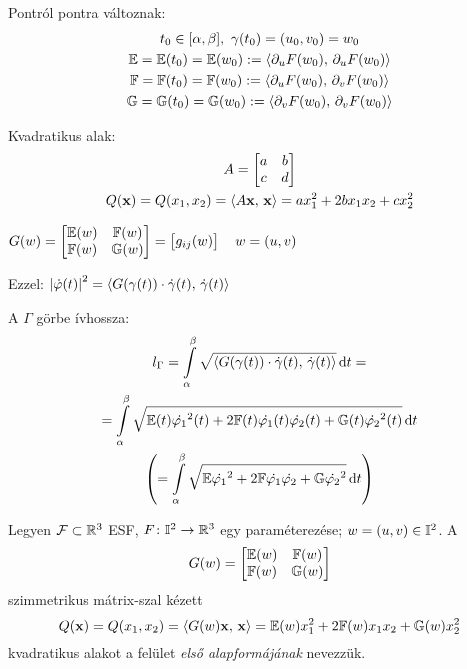 \begin{de}%
  Pontról pontra változnak:
  \begin{gather*}
    t_0\in[\alpha,\beta],\ \gamma(t_0)=(u_0,v_0)=w_0\\
    \mathbb E = \mathbb E(t_0) = \mathbb E(w_0) :=\langle\partial_uF(w_0),\,\partial_uF(w_0)\rangle\\
    \mathbb F = \mathbb F(t_0) = \mathbb F(w_0) :=\langle\partial_uF(w_0),\,\partial_vF(w_0)\rangle\\
    \mathbb G = \mathbb G(t_0) = \mathbb G(w_0) :=\langle\partial_vF(w_0),\,\partial_vF(w_0)\rangle
  \end{gather*}  
\end{de}
\begin{Megj}
\item Kvadratikus alak: 
  \begin{gather*}
    A = \begin{bmatrix} a & b \\ c & d \end{bmatrix}\\
    Q(\mathbf{x}) = Q(x_1,x_2) = \langle A\mathbf{x},\,\mathbf{x}\rangle = ax_1^2 + 2bx_1x_2 + cx_2^2
  \end{gather*}
\item  $G(w) = \begin{bmatrix} \mathbb E(w) &\mathbb F(w)\\ \mathbb F(w) &\mathbb G(w) \end{bmatrix} = \begin{bmatrix} g_{ij}(w) \end{bmatrix}
  \quad w = (u,v)$  
  
  \noindent Ezzel: $\left\vert \Dot{\varphi}(t) \right\vert^2 = \langle G(\gamma(t))\cdot\Dot\gamma(t),\,\Dot\gamma(t)\rangle$
  
  \noindent A $\Gamma$ görbe ívhossza:
  \begin{gather*}
    l_\Gamma = \Int_\alpha^\beta \sqrt{ \skalar{G(\gamma(t))\cdot\Dot\gamma(t)}{\Dot\gamma(t)}}\diff t = \\
    = \Int_\alpha^\beta \sqrt{ \eE(t)\Dot{\vfi_1}^2(t) + 2\eF(t)\Dot{\vfi_1}(t)\Dot{\vfi_2}(t) +
      \eG(t)\Dot{\vfi_2}^2(t)} \diff t\\ \left(= \Int_\alpha^\beta \sqrt{\eE\Dot{\vfi_1}^2 + 2\eF\Dot{\vfi_1}\Dot{\vfi_2}
      + \eG\Dot{\vfi_2}^2}\diff t\right)    
\end{gather*}
\end{Megj}

\begin{de}
  Legyen $\mathcal F\subset\mathbb{R}^3$ ESF, $F\colon \mathbb I^2\to\mathbb{R}^3$ egy paraméterezése; $w=(u,v)\in\mathbb I^2$. A
  \[ G(w) = \begin{bmatrix} \mathbb E(w) &\mathbb F(w)\\ \mathbb F(w) &\mathbb G(w) \end{bmatrix} \]
  szimmetrikus mátrix-szal kézett
  \[  Q(\mathbf{x}) = Q(x_1,x_2) = \langle G(w)\mathbf{x},\,\mathbf{x}\rangle = \mathbb E(w)x_1^2 + 2\mathbb F(w)x_1x_2 + \mathbb G(w)x_2^2\]
  kvadratikus alakot a felület \emph{első alapformájának} nevezzük.  
\end{de}

